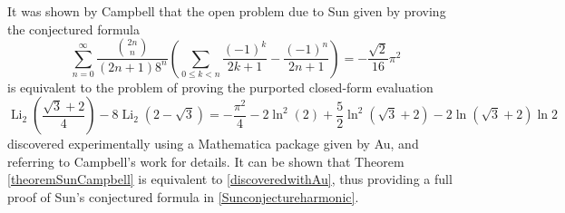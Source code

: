 \documentclass[12pt]{article}
\begin{document}
 It was shown by Campbell \cite{Campbell2023} that the open problem due to Sun \cite{Sun2021,Sun2015} given by proving the 
 conjectured formula 
\begin{equation}\label{Sunconjectureharmonic}
 \sum_{n=0}^{\infty} \frac{ \binom{2n}{n} }{ (2n+1) 8^{n} } \left( \sum_{0 \leq k < n} 
 \frac{(-1)^k}{2k+1} - \frac{(-1)^n}{2n+1} \right) = -\frac{\sqrt{2}}{16} \pi^2 
\end{equation}
 is equivalent to the problem of proving the purported closed-form evaluation 
\begin{equation}\label{discoveredwithAu}
 \operatorname{Li}_{2}\left( \frac{\sqrt{3} + 2}{4} \right) - 8 \operatorname{Li}_{2}(2 - \sqrt{3}) 
 = -\frac{\pi^2}{4} - 2 \ln^{2}(2) + \frac{5}{2} \ln^2(\sqrt{3} + 2) - 2 \ln(\sqrt{3} + 2) \ln 2 
\end{equation}
 discovered experimentally using a Mathematica package given by Au, and referring to Campbell's work \cite{Campbell2023} for details. 
 It can be shown that Theorem \ref{theoremSunCampbell} is equivalent to \eqref{discoveredwithAu}, thus providing a full proof of Sun's 
 conjectured formula in \eqref{Sunconjectureharmonic}. 
\end{document}
